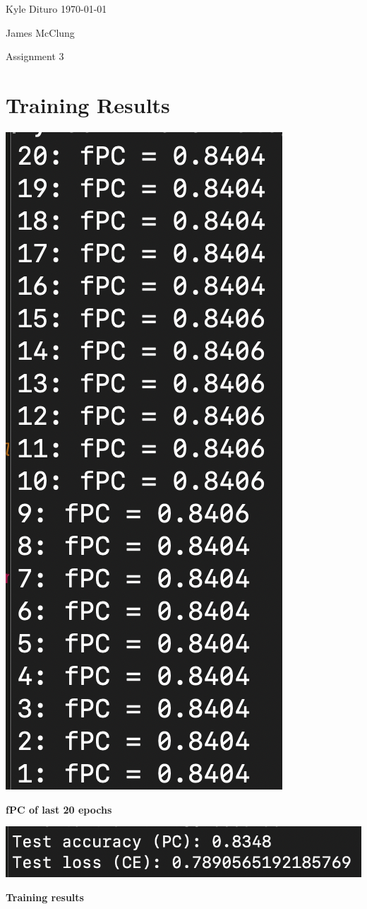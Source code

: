 \documentclass[12pt, letterpaper, notitlepage, twoside]{article}
\theoremstyle{definition}
\theoremstyle{plain}
\begin{document}
Kyle Dituro \hfill \today

James McClung
\begin{center}
{\huge Assignment 3}
\end{center}

\section{Training Results}
\begin{center}
    \includegraphics{Imgs/fPC.png}
    
    \textbf{fPC of last 20 epochs}

    \pagebreak
    \includegraphics{Imgs/results.png}

    \textbf{Training results}
\end{center}
\end{document}
